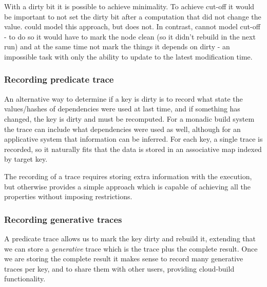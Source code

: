 With a dirty bit it is possible to achieve minimality. To achieve cut-off it would be important to not set the dirty bit after a computation that did not change the value. \Excel could model this approach, but does not. In contrast, \Make cannot model cut-off - to do so it would have to mark the node clean (so it didn't rebuild in the next run) and at the same time not mark the things it depends on dirty - an impossible task with only the ability to update to the latest modification time.

\subsubsection{Recording predicate trace}

An alternative way to determine if a key is dirty is to record what state the values/hashes of dependencies were used at last time, and if something has changed, the key is dirty and must be recomputed. For a monadic build system the trace can include what dependencies were used as well, although for an applicative system that information can be inferred. For each key, a single trace is recorded, so it naturally fits that the data is stored in an associative map indexed by target key.

The recording of a trace requires storing extra information with the execution, but otherwise provides a simple approach which is capable of achieving all the properties without imposing restrictions.

\subsubsection{Recording generative traces}

A predicate trace allows us to mark the key dirty and rebuild it, extending that we can store a \textit{generative} trace which is the trace plus the complete result. Once we are storing the complete result it makes sense to record many generative traces per key, and to share them with other users, providing cloud-build functionality.



